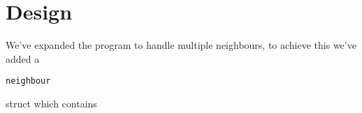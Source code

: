 \section{Design}
We've expanded the program to handle multiple neighbours,
to achieve this we've added a
\begin{lstlisting}
neighbour
\end{lstlisting}
struct which contains
